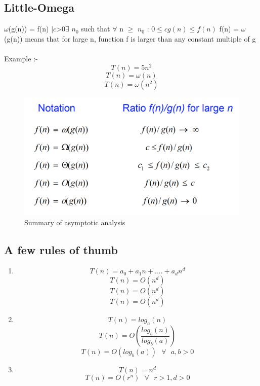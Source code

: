 \subsection{Little-Omega}
$\omega$(g(n)) = { f(n) $|  $\forall$ $\constant$ c $>$ 0 \exists$ $n_0$ such that $\forall$ n $\geq$ $n_0$ : $0 \leq cg(n) \leq f(n) $ }
f(n) = $\omega$(g(n)) means that for large n, function f is larger than
any constant multiple of g
\\\\Example :-
\[ T(n) = 5n^2 \]
\[ T(n) = \omega(n) \]
\[ T(n) = \omega(n^2) \]

\begin{figure}[H]
\centering
\includegraphics[scale=0.35]{figures/MDS8.png}
\caption{Summary of asymptotic analysis}
    \label{fig:example_figure}
\end{figure}

\subsection{A few rules of thumb}

\begin{enumerate}
    \item 
    \[ T(n) = a_0 + a_1 n + .... + a_d n^d \]
    \[ T(n) = O(n^d) \]
    \[ T(n) = O(n^d) \]
    \[ T(n) = O(n^d) \]
    
    \item 
    \[ T(n) = log_a(n) \]
    \[ T(n) = O(\frac{log_b(n)}{log_b(a)}) \]
    \[ T(n) = O(log_b(a)) \text{ } \forall \text{ } a, b > 0 \]
    
    \item 
    \[ T(n) = n^d \]
    \[ T(n) = O(r^n) \text{ } \forall \text{ } r > 1, d > 0 \]

\end{enumerate}



